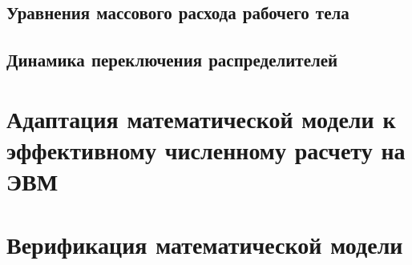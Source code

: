 \subsection{Уравнения массового расхода рабочего тела}\label{sec:ch2/sec3/subsec1}

\subsection{Динамика переключения распределителей}\label{sec:ch2/sec3/subsec2}


\section{Адаптация математической модели к эффективному численному расчету на ЭВМ}\label{sec:ch2/sec5}

\section{Верификация математической модели}\label{sec:ch2/sec6}
